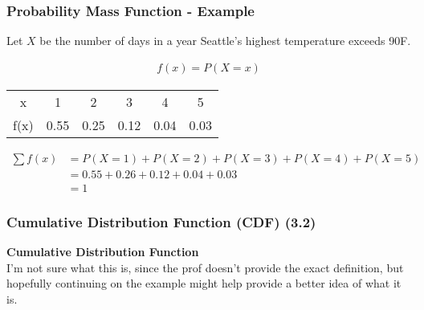 \documentclass[../INDE315.tex]{subfiles}
\begin{document}
\subsubsection*{Probability Mass Function - Example}
\begin{exmp}
    Let $X$ be the number of days in a year Seattle's highest temperature exceeds 90F.
\end{exmp}

\begin{equation*}
    \begin{aligned}
        f(x) = P(X = x)
    \end{aligned}
\end{equation*}
\begin{center}
    \begin{tabular}{c c c c c c}
        x & 1 & 2 & 3 & 4 & 5 \\
        f(x) & 0.55 & 0.25 & 0.12 & 0.04 & 0.03  
    \end{tabular}        
\end{center}

\begin{equation*}
    \begin{aligned}
        \sum f(x) &= P(X = 1) + P(X = 2) + P(X = 3) + P(X = 4) + P(X = 5) \\
                & = 0.55 + 0.26 + 0.12 + 0.04 + 0.03 \\
                & = 1
    \end{aligned}
\end{equation*} 

\subsubsection*{Cumulative Distribution Function (CDF) (3.2)}
\begin{defn}
    \textbf{Cumulative Distribution Function} \\
    I'm not sure what this is, since the prof doesn't provide the exact definition, but hopefully continuing on the example might help provide a better idea of what it is.
\end{defn}
\end{document}
